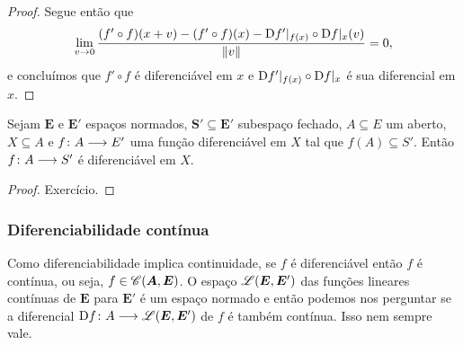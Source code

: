 \begin{proof}
Segue então que
	\begin{equation*}
	\lim_{v \rightarrow 0} \frac{(f' \circ f)(x+v) - (f' \circ f)(x) - \mathrm{D} f'|_{f(x)} \circ \mathrm{D} f|_x(v)}{\left\Vert{v}\right\Vert} = 0,
	\end{equation*}
e concluímos que $f' \circ f$ é diferenciável em $x$ e $\mathrm{D} f'|_{f(x)} \circ \mathrm{D} f|_x$ é sua diferencial em $x$.
\end{proof}

\begin{proposition}
\label{prop:restricao.imagem.diferencial}
Sejam $\bm E$ e $\bm E'$ espaços normados, $\bm S' \subseteq \bm E'$ subespaço fechado, $A \subseteq E$ um aberto, $X \subseteq A$ e $f\colon \allowbreak A \longrightarrow E'$ uma função diferenciável em $X$ tal que $f(A) \subseteq S'$. Então $f\colon \allowbreak A \longrightarrow S'$ é diferenciável em $X$.
\end{proposition}

\begin{proof}
Exercício.
\end{proof}

\subsubsection{Diferenciabilidade contínua}

Como diferenciabilidade implica continuidade, se $f$ é diferenciável então $f$ é contínua, ou seja, $f \in \mathscr{C}(\bm A, \bm E)$. O espaço $\mathscr{L}(\bm E, \bm E')$ das funções lineares contínuas de $\bm E$ para $\bm E'$ é um espaço normado e então podemos nos perguntar se a diferencial $\mathrm{D} f\colon \allowbreak A \longrightarrow \mathscr{L}(\bm E, \bm E')$ de $f$ é também contínua. Isso nem sempre vale.

